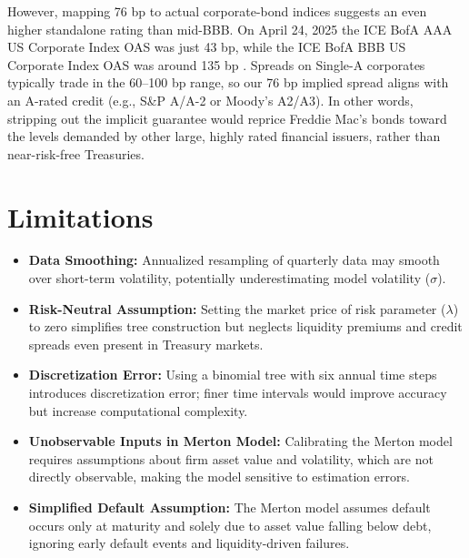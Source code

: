 \documentclass{article}
\begin{document}
However, mapping 76 bp to actual corporate-bond indices suggests an even higher standalone rating than mid-BBB. On April 24, 2025 the ICE BofA AAA US Corporate Index OAS was just 43 bp, while the ICE BofA BBB US Corporate Index OAS was around 135 bp . Spreads on Single-A corporates typically trade in the 60–100 bp range, so our 76 bp implied spread aligns with an A-rated credit (e.g., S\&P A/A-2 or Moody’s A2/A3). In other words, stripping out the implicit guarantee would reprice Freddie Mac’s bonds toward the levels demanded by other large, highly rated financial issuers, rather than near-risk-free Treasuries.

\section{Limitations}

\begin{itemize}
    \item \textbf{Data Smoothing:} Annualized resampling of quarterly data may smooth over short-term volatility, potentially underestimating model volatility ($\sigma$).
\end{itemize}

\begin{itemize}
    \item \textbf{Risk-Neutral Assumption:} Setting the market price of risk parameter ($\lambda$) to zero simplifies tree construction but neglects liquidity premiums and credit spreads even present in Treasury markets.
\end{itemize}

\begin{itemize}
    \item \textbf{Discretization Error:} Using a binomial tree with six annual time steps introduces discretization error; finer time intervals would improve accuracy but increase computational complexity.
\end{itemize}

\begin{itemize}
    \item \textbf{Unobservable Inputs in Merton Model:} Calibrating the Merton model requires assumptions about firm asset value and volatility, which are not directly observable, making the model sensitive to estimation errors.
\end{itemize}

\begin{itemize}
    \item \textbf{Simplified Default Assumption:} The Merton model assumes default occurs only at maturity and solely due to asset value falling below debt, ignoring early default events and liquidity-driven failures.
\end{itemize}
\end{document}
